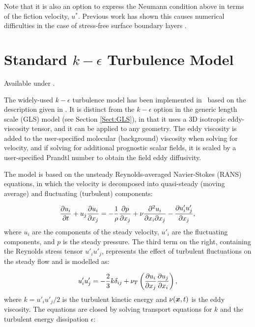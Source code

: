 Note that it is also an option to express the Neumann condition above in terms
of the fiction velocity, $u^*$. Previous work has shown this causes numerical
difficulties in the case of stress-free surface boundary layers \citep{burchard1999}.


\section{Standard $k-\epsilon$ Turbulence Model}\label{Sect:kepsilon}

Available under .

The widely-used $k-\epsilon$ turbulence model has been implemented in \fluidity\ based on the description given in
\citet{mathieu2000}. It is distinct from the $k-\epsilon$ option in the generic length scale (GLS) model (see
Section \ref{Sect:GLS}), in that it uses a 3D isotropic eddy-viscosity tensor, and it can be applied to any geometry. The eddy viscosity is added to the user-specified molecular (background) viscosity when solving for velocity, and if solving for additional prognostic scalar fields, it is scaled by a user-specified Prandtl number to obtain the field eddy diffusivity.

The model is based on the unsteady Reynolds-averaged Navier-Stokes (RANS) equations, in which the velocity is decomposed into quasi-steady (moving average) and fluctuating (turbulent) components:

\begin{equation}\label{RANS}
\ppt[t]{u_i} + u_j \ppx[x_j]{u_i} = - \frac{1}{\rho } \ppx[x_j]{p} + \nu \frac{\partial^2 u_i}{\partial x_i \partial x_j} - \ppx[x_j]{u'_i u'_j},
\end{equation}
where $u_i$ are the components of the steady velocity, $u'_i$ are the fluctuating components, and $p$ is the steady pressure.
The third term on the right, containing the Reynolds stress tensor $u'_i u'_j$, represents the effect of turbulent fluctuations on the steady flow and is modelled as:

\begin{equation}\label{retens}
u'_i u'_j = - \frac 2 3 k \delta_{ij} + \nu_T \left (\ppx[x_j]{u_i} \ppx[x_i]{u_j} \right ),
\end{equation}
where $k=u'_i u'_j/2$ is the turbulent kinetic energy and $\nu(\bmx,t)$ is the eddy viscosity.
The equations are closed by solving transport equations for $k$ and the turbulent energy dissipation $\epsilon$:

